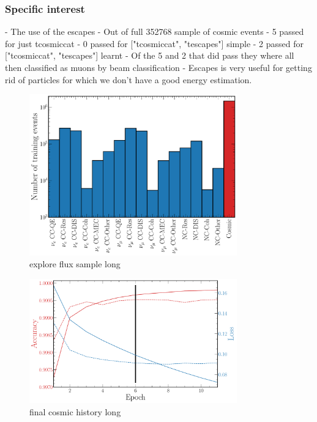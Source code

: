 \subsubsection*{Specific interest} %
- The use of the escapes
- Out of full 352768 sample of cosmic events
- 5 passed for just tcosmiccat
- 0 passed for ["tcosmiccat", "tescapes"] simple
- 2 passed for ["tcosmiccat", "tescapes"] learnt
- Of the 5 and 2 that did pass they where all then classified as muons by beam classification
- Escapes is very useful for getting rid of particles for which we don't have a good energy
estimation.

\begin{figure} %
    \includegraphics[width=0.8\textwidth]{diagrams/6-cvn/chipsnet/explore_cosmic_training_sample.pdf}
    \caption[explore flux sample short]
    {explore flux sample long}
    \label{fig:explore_flux_sample}
\end{figure}

\begin{figure} %
    \includegraphics[width=0.8\textwidth]{diagrams/6-cvn/chipsnet/final_cosmic_history.pdf}
    \caption[final cosmic history short]
    {final cosmic history long}
    \label{fig:final_cosmic_history}
\end{figure}


